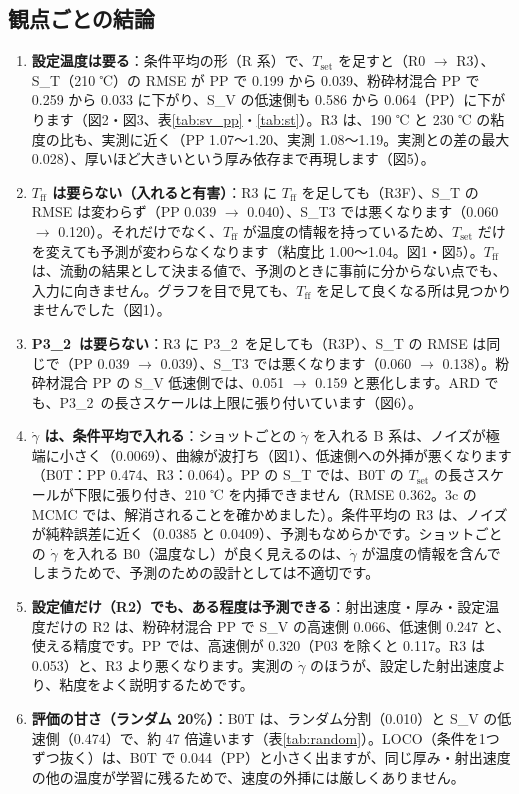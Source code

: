 \documentclass[paper=a4paper,fontsize=10.5pt,line_length=44zw,number_of_lines=38]{jlreq}
\newcommand{\gd}{\dot{\gamma}}
\newcommand{\PII}{P3\_2}
\newcommand{\Tff}{T_{\mathrm{ff}}}
\newcommand{\Tset}{T_{\mathrm{set}}}
\begin{document}
\subsection{観点ごとの結論}
\begin{enumerate}[itemsep=0.6ex,topsep=0.6ex]
\item \textbf{設定温度は要る}：条件平均の形（R 系）で、$\Tset$ を足すと（R0 $\to$ R3）、S\_T（210 ℃）の RMSE が PP で 0.199 から 0.039、粉砕材混合 PP で 0.259 から 0.033 に下がり、S\_V の低速側も 0.586 から 0.064（PP）に下がります（図2・図3、表\ref{tab:sv_pp}・\ref{tab:st}）。R3 は、190 ℃ と 230 ℃ の粘度の比も、実測に近く（PP 1.07〜1.20、実測 1.08〜1.19。実測との差の最大 0.028）、厚いほど大きいという厚み依存まで再現します（図5）。
\item \textbf{$\Tff$ は要らない（入れると有害）}：R3 に $\Tff$ を足しても（R3F）、S\_T の RMSE は変わらず（PP 0.039 $\to$ 0.040）、S\_T3 では悪くなります（0.060 $\to$ 0.120）。それだけでなく、$\Tff$ が温度の情報を持っているため、$\Tset$ だけを変えても予測が変わらなくなります（粘度比 1.00〜1.04。図1・図5）。$\Tff$ は、流動の結果として決まる値で、予測のときに事前に分からない点でも、入力に向きません。グラフを目で見ても、$\Tff$ を足して良くなる所は見つかりませんでした（図1）。
\item \textbf{\PII\ は要らない}：R3 に \PII\ を足しても（R3P）、S\_T の RMSE は同じで（PP 0.039 $\to$ 0.039）、S\_T3 では悪くなります（0.060 $\to$ 0.138）。粉砕材混合 PP の S\_V 低速側では、0.051 $\to$ 0.159 と悪化します。ARD でも、\PII\ の長さスケールは上限に張り付いています（図6）。
\item \textbf{$\gd$ は、条件平均で入れる}：ショットごとの $\gd$ を入れる B 系は、ノイズが極端に小さく（0.0069）、曲線が波打ち（図1）、低速側への外挿が悪くなります（B0T：PP 0.474、R3：0.064）。PP の S\_T では、B0T の $\Tset$ の長さスケールが下限に張り付き、210 ℃ を内挿できません（RMSE 0.362。3c の MCMC では、解消されることを確かめました）。条件平均の R3 は、ノイズが純粋誤差に近く（0.0385 と 0.0409）、予測もなめらかです。ショットごとの $\gd$ を入れる B0（温度なし）が良く見えるのは、$\gd$ が温度の情報を含んでしまうためで、予測のための設計としては不適切です。
\item \textbf{設定値だけ（R2）でも、ある程度は予測できる}：射出速度・厚み・設定温度だけの R2 は、粉砕材混合 PP で S\_V の高速側 0.066、低速側 0.247 と、使える精度です。PP では、高速側が 0.320（P03 を除くと 0.117。R3 は 0.053）と、R3 より悪くなります。実測の $\gd$ のほうが、設定した射出速度より、粘度をよく説明するためです。
\item \textbf{評価の甘さ（ランダム 20\%）}：B0T は、ランダム分割（0.010）と S\_V の低速側（0.474）で、約 47 倍違います（表\ref{tab:random}）。LOCO（条件を1つずつ抜く）は、B0T で 0.044（PP）と小さく出ますが、同じ厚み・射出速度の他の温度が学習に残るためで、速度の外挿には厳しくありません。

\end{enumerate}
\end{document}
